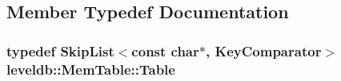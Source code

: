 \subsection{Member Typedef Documentation}
\hypertarget{classleveldb_1_1_mem_table_af42bc32bc4c20aea12fc647ee41df058}{
\subsubsection[{Table}]{\setlength{\rightskip}{0pt plus 5cm}typedef {\bf Skip\-List}$<$const char$\ast$, {\bf Key\-Comparator}$>$ {\bf leveldb\-::\-Mem\-Table\-::\-Table}\hspace{0.3cm}{\ttfamily [private]}}}\label{classleveldb_1_1_mem_table_af42bc32bc4c20aea12fc647ee41df058}


